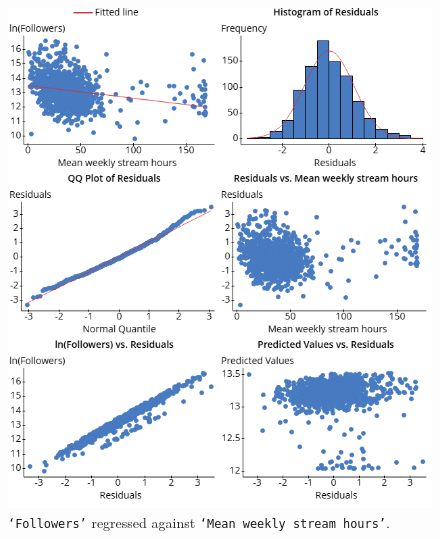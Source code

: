 \documentclass[12pt]{article}
\begin{document}
\begin{figure}[H]
\centering
	\includegraphics[height=0.7\textheight]{../StatCrunch_Results/ln_followers_stream/plot}
	\captionsetup{justification=centering, singlelinecheck=false, margin=2cm}
	\caption[Residual Plots: Followers by Stream Time]{\texttt{`Followers'} regressed against \texttt{`Mean weekly stream hours'}. }
	\label{fig:ln_followers_stream_plot}
\end{figure}
\end{document}
